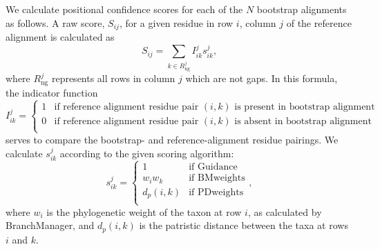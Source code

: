 \documentclass[10pt]{article}
\begin{document}
We calculate positional confidence scores for each of the $N$ bootstrap alignments as follows. A raw score, $S_{ij}$, for a given residue in row $i$, column $j$ of the reference alignment is calculated as \begin{equation} S_{ij} = \sum\limits_{k \in R_\text{ng}^j} I_{ik}^j s_{ik}^j    ,\end{equation} where $R_\text{ng}^j$ represents all rows in column $j$ which are not gaps.
In this formula, the indicator function 
\begin{equation}I_{ik}^j = \left\{ \begin{array}{rl}

              1                         &\mbox{if reference alignment residue pair $(i, k)$ is present in bootstrap alignment} \\
              0            &\mbox{if reference alignment residue pair $(i, k)$ is absent in bootstrap alignment} \\
                     \end{array} \right. 
\end{equation}
serves to compare the bootstrap- and reference-alignment residue pairings.
We calculate $s_{ik}^j$ according to the given scoring algorithm:
\begin{equation}
s_{ik}^j = \left\{ \begin{array}{rl}

              1                         &\mbox{if Guidance} \\
              w_iw_k              &\mbox{if BMweights} \\
              d_p(i,k)              &\mbox{if PDweights} \\
                     \end{array} \right.,
\end{equation} where $w_i$ is the phylogenetic weight of the taxon at row $i$, as calculated by BranchManager, and $d_p(i, k)$ is the patristic distance between the taxa at rows $i$ and $k$. 
\end{document}
